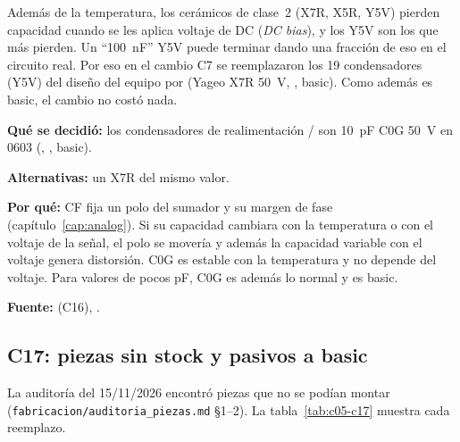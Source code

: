 Además de la temperatura, los cerámicos de clase~2 (X7R, X5R, Y5V) pierden capacidad cuando se les aplica voltaje de DC (\emph{DC bias}), y los Y5V son los que más pierden. Un ``\SI{100}{\nano\farad}'' Y5V puede terminar dando una fracción de eso en el circuito real. Por eso en el cambio C7 se reemplazaron los 19 condensadores  (Y5V) del diseño del equipo por  (Yageo X7R \SI{50}{\volt}, , basic). Como además es basic, el cambio no costó nada.

\begin{decision}
\textbf{Qué se decidió:} los condensadores de realimentación / son \SI{10}{\pico\farad} C0G \SI{50}{\volt} en 0603 (, , basic).

\textbf{Alternativas:} un X7R del mismo valor.

\textbf{Por qué:} CF fija un polo del sumador y su margen de fase (capítulo~\ref{cap:analog}). Si su capacidad cambiara con la temperatura o con el voltaje de la señal, el polo se movería y además la capacidad variable con el voltaje genera distorsión. C0G es estable con la temperatura y no depende del voltaje. Para valores de pocos pF, C0G es además lo normal y es basic.

\textbf{Fuente:}  (C16), .
\end{decision}

\subsection{C17: piezas sin stock y pasivos a basic}\label{sec:c05-c17}

La auditoría del 15/11/2026 encontró piezas que no se podían montar (\nolinkurl{fabricacion/auditoria_piezas.md} §1--2). La tabla~\ref{tab:c05-c17} muestra cada reemplazo.


